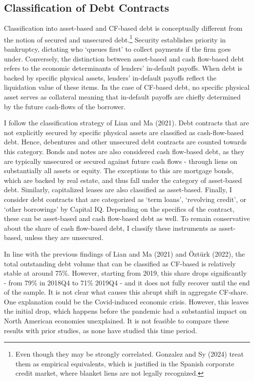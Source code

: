 \documentclass[12pt]{article}
\begin{document}
\subsection{Classification of Debt Contracts \label{sec:classification}}
Classification into asset-based and CF-based debt is conceptually different from the notion of secured and unsecured debt.\footnote{Even though they may be strongly correlated. Gonzalez and Sy (2024) treat them as empirical equivalents, which is justified in the Spanish corporate credit market, where blanket liens are not legally recognized.} Security establishes priority in bankruptcy, dictating who `queues first' to collect payments if the firm goes under. Conversely, the distinction between asset-based and cash flow-based debt refers to the economic determinants of lenders' in-default payoffs. When debt is backed by specific physical assets, lenders' in-default payoffs reflect the liquidation value of these items. In the case of CF-based debt, no specific physical asset serves as collateral meaning that in-default payoffs are chiefly determined by the future cash-flows of the borrower. 

I follow the classification strategy of Lian and Ma (2021). Debt contracts that are not explicitly secured by specific physical assets are classified as cash-flow-based debt. Hence, debentures and other unsecured debt contracts are counted towards this category. Bonds and notes are also considered cash flow-based debt, as they are typically unsecured or secured against future cash flows - through liens on substantially all assets or equity. The exceptions to this are mortgage bonds, which are backed by real estate, and thus fall under the category of asset-based debt. Similarly, capitalized leases are also classified as asset-based. Finally, I consider debt contracts that are categorized as `term loans', `revolving credit', or `other borrowings' by Capital IQ. Depending on the specifics of the contract, these can be asset-based and cash flow-based debt as well. To remain conservative about the share of cash flow-based debt, I classify these instruments as asset-based, unless they are unsecured. 
 
In line with the previous findings of Lian and Ma (2021) and Öztürk (2022), the total outstanding debt volume that can be classified as CF-based is relatively stable at around 75\%. However, starting from 2019, this share drops significantly - from 79\% in 2018Q4 to 71\% 2019Q4 - and it does not fully recover until the end of the sample. It is not clear what causes this abrupt shift in aggregate CF-share. One explanation could be the Covid-induced economic crisis. However, this leaves the initial drop, which happens before the pandemic had a substantial impact on North American economies unexplained. It is not feasible to compare these results with prior studies, as none have studied this time period.
\end{document}
